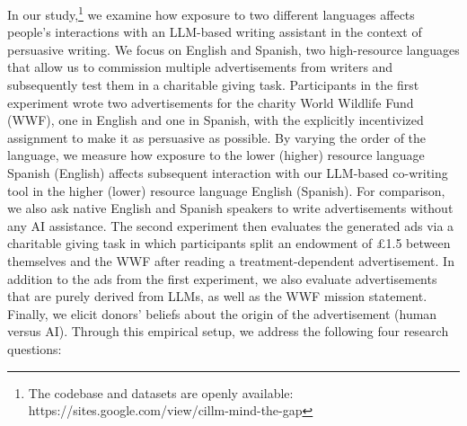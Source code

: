 


In our study,\footnote{The codebase and datasets are openly available: https://sites.google.com/view/cillm-mind-the-gap} we examine how exposure to two different languages affects people's interactions with an LLM-based writing assistant in the context of persuasive writing. We focus on English and Spanish, two high-resource languages that allow us to commission multiple advertisements from writers and subsequently test them in a charitable giving task. Participants in the first experiment wrote two advertisements for the charity World Wildlife Fund (WWF), one in English and one in Spanish, with the explicitly incentivized assignment to make it as persuasive as possible. By varying the order of the language, we measure how exposure to the lower (higher) resource language Spanish (English) affects subsequent interaction with our LLM-based co-writing tool in the higher (lower) resource language English (Spanish). For comparison, we also ask native English and Spanish speakers to write advertisements without any AI assistance. The second experiment then evaluates the generated ads via a charitable giving task in which participants split an endowment of \pounds1.5 between themselves and the WWF after reading a treatment-dependent advertisement. In addition to the ads from the first experiment, we also evaluate advertisements that are purely derived from LLMs, as well as the WWF mission statement. Finally, we elicit donors' beliefs about the origin of the advertisement (human versus AI). Through this empirical setup, 
we address the following four research questions:


